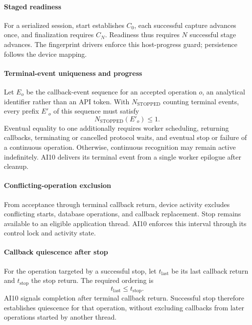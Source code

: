 \paragraph{Staged readiness}
For a serialized session, start establishes $C_0$, each successful capture advances once, and finalization requires $C_N$. Readiness thus requires $N$ successful stage advances. The fingerprint drivers enforce this host-progress guard; persistence follows the device mapping.

\paragraph{Terminal-event uniqueness and progress}
Let $E_o$ be the callback-event sequence for an accepted operation $o$, an analytical identifier rather than an API token. With $N_{\mathrm{STOPPED}}$ counting terminal events, every prefix $E'_o$ of this sequence must satisfy
\begin{equation}
N_{\mathrm{STOPPED}}(E'_o) \leq 1.
\end{equation}
Eventual equality to one additionally requires worker scheduling, returning callbacks, terminating or cancelled protocol waits, and eventual stop or failure of a continuous operation. Otherwise, continuous recognition may remain active indefinitely. AI10 delivers its terminal event from a single worker epilogue after cleanup.

\paragraph{Conflicting-operation exclusion}
From acceptance through terminal callback return, device activity excludes conflicting starts, database operations, and callback replacement. Stop remains available to an eligible application thread. AI10 enforces this interval through its control lock and activity state.

\paragraph{Callback quiescence after stop}
For the operation targeted by a successful stop, let $t_{\mathrm{last}}$ be its last callback return and $t_{\mathrm{stop}}$ the stop return. The required ordering is
\begin{equation}
t_{\mathrm{last}} \leq t_{\mathrm{stop}}.
\end{equation}
AI10 signals completion after terminal callback return. Successful stop therefore establishes quiescence for that operation, without excluding callbacks from later operations started by another thread.

